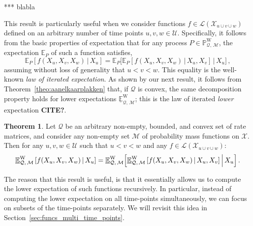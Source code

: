 \documentclass[10pt,a4paper]{paper}
\theoremstyle{definition}
\newtheorem{theorem}{Theorem}[section]
\newcommand{\states}{\mathcal{X}}
\newcommand{\processes}{\mathbb{P}}
\newcommand{\wprocesses}{\processes^{\mathrm{W}}}
\newcommand{\wmprocesses}{\processes^{\mathrm{WM}}}
\newcommand{\gambles}{\mathcal{L}}
\newcommand{\rateset}{\mathcal{Q}}
\begin{document}


*** blabla

This result is particularly useful when we consider functions $f\in\gambles(\states_{u\cup v\cup w})$ defined on an arbitrary number of time points $u,v,w\in\mathcal{U}$. Specifically, it follows from the basic properties of expectation that for any process $P\in\wprocesses_{\rateset,\,\mathcal{M}}$, the expectation $\mathbb{E}_P$ of such a function satisfies,
\begin{equation*}
\mathbb{E}_P[f(X_u,X_v,X_w)\,\vert\,X_u] = \mathbb{E}_P\bigl[\mathbb{E}_P[f(X_u,X_v,X_w)\,\vert\,X_u,X_v]\,\big\vert\,X_u\bigr]\,,
\end{equation*}
assuming without loss of generality that $u<v<w$. This equality is the well-known \emph{law of iterated expectation}. As shown by our next result, it follows from Theorem~\ref{theo:aanelkaarplakken} that, if $\rateset$ is convex, the same decomposition property holds for lower expectations $\underline{\mathbb{E}}^{\mathrm{W}}_{\rateset,\,\mathcal{M}}$; this is the law of iterated \emph{lower} expectation {\bf CITE?}.

\begin{theorem}\label{theorem:decomposition_multivar}
Let $\rateset$ be an arbitrary non-empty, bounded, and convex set of rate matrices, and consider any non-empty set $\mathcal{M}$ of probability mass functions on $\states$. Then for any $u,v,w\in\mathcal{U}$ such that $u<v<w$ and any $f\in\gambles(\states_{u\cup v\cup w})$:
\begin{equation}\label{eq:lower_exp_factorizes}
\underline{\mathbb{E}}^{\mathrm{W}}_{\rateset,\,\mathcal{M}}\left[f(X_u,X_v,X_w)\,\vert\,X_u\right] = \underline{\mathbb{E}}^{\mathrm{W}}_{\rateset,\,\mathcal{M}}\Bigl[\underline{\mathbb{E}}^{\mathrm{W}}_{\rateset,\,\mathcal{M}}\left[f(X_u,X_v,X_w)\,\vert\,X_u,X_v\right] \Big\vert\,X_u\Bigr]\,. 
\end{equation}
\end{theorem}
The reason that this result is useful, is that it essentially allows us to compute the lower expectation of such functions recursively. In particular, instead of computing the lower expectation on all time-points simultaneously, we can focus on subsets of the time-points separately. We will revisit this idea in Section~\ref{sec:funcs_multi_time_points}.
\end{document}
